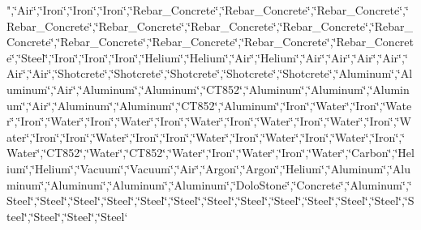 \begin{DoxyCompactItemize}
"{},\char`\"{}Air\char`\"{},\char`\"{}Iron\char`\"{},\char`\"{}Iron\char`\"{},\char`\"{}Iron\char`\"{},\char`\"{}Rebar\-\_\-\-Concrete\char`\"{},\char`\"{}Rebar\-\_\-\-Concrete\char`\"{},\char`\"{}Rebar\-\_\-\-Concrete\char`\"{},\char`\"{}Rebar\-\_\-\-Concrete\char`\"{},\char`\"{}Rebar\-\_\-\-Concrete\char`\"{},\char`\"{}Rebar\-\_\-\-Concrete\char`\"{},\char`\"{}Rebar\-\_\-\-Concrete\char`\"{},\char`\"{}Rebar\-\_\-\-Concrete\char`\"{},\char`\"{}Rebar\-\_\-\-Concrete\char`\"{},\char`\"{}Rebar\-\_\-\-Concrete\char`\"{},\char`\"{}Rebar\-\_\-\-Concrete\char`\"{},\char`\"{}Rebar\-\_\-\-Concrete\char`\"{},\char`\"{}Steel\char`\"{},\char`\"{}Iron\char`\"{},\char`\"{}Iron\char`\"{},\char`\"{}Iron\char`\"{},\char`\"{}Helium\char`\"{},\char`\"{}Helium\char`\"{},\char`\"{}Air\char`\"{},\char`\"{}Helium\char`\"{},\char`\"{}Air\char`\"{},\char`\"{}Air\char`\"{},\char`\"{}Air\char`\"{},\char`\"{}Air\char`\"{},\char`\"{}Air\char`\"{},\char`\"{}Air\char`\"{},\char`\"{}Shotcrete\char`\"{},\char`\"{}Shotcrete\char`\"{},\char`\"{}Shotcrete\char`\"{},\char`\"{}Shotcrete\char`\"{},\char`\"{}Shotcrete\char`\"{},\char`\"{}Aluminum\char`\"{},\char`\"{}Aluminum\char`\"{},\char`\"{}Air\char`\"{},\char`\"{}Aluminum\char`\"{},\char`\"{}Aluminum\char`\"{},\char`\"{}C\-T852\char`\"{},\char`\"{}Aluminum\char`\"{},\char`\"{}Aluminum\char`\"{},\char`\"{}Aluminum\char`\"{},\char`\"{}Air\char`\"{},\char`\"{}Aluminum\char`\"{},\char`\"{}Aluminum\char`\"{},\char`\"{}C\-T852\char`\"{},\char`\"{}Aluminum\char`\"{},\char`\"{}Iron\char`\"{},\char`\"{}Water\char`\"{},\char`\"{}Iron\char`\"{},\char`\"{}Water\char`\"{},\char`\"{}Iron\char`\"{},\char`\"{}Water\char`\"{},\char`\"{}Iron\char`\"{},\char`\"{}Water\char`\"{},\char`\"{}Iron\char`\"{},\char`\"{}Water\char`\"{},\char`\"{}Iron\char`\"{},\char`\"{}Water\char`\"{},\char`\"{}Iron\char`\"{},\char`\"{}Water\char`\"{},\char`\"{}Iron\char`\"{},\char`\"{}Water\char`\"{},\char`\"{}Iron\char`\"{},\char`\"{}Iron\char`\"{},\char`\"{}Water\char`\"{},\char`\"{}Iron\char`\"{},\char`\"{}Iron\char`\"{},\char`\"{}Water\char`\"{},\char`\"{}Iron\char`\"{},\char`\"{}Water\char`\"{},\char`\"{}Iron\char`\"{},\char`\"{}Water\char`\"{},\char`\"{}Iron\char`\"{},\char`\"{}Water\char`\"{},\char`\"{}C\-T852\char`\"{},\char`\"{}Water\char`\"{},\char`\"{}C\-T852\char`\"{},\char`\"{}Water\char`\"{},\char`\"{}Iron\char`\"{},\char`\"{}Water\char`\"{},\char`\"{}Iron\char`\"{},\char`\"{}Water\char`\"{},\char`\"{}Carbon\char`\"{},\char`\"{}Helium\char`\"{},\char`\"{}Helium\char`\"{},\char`\"{}Vacuum\char`\"{},\char`\"{}Vacuum\char`\"{},\char`\"{}Air\char`\"{},\char`\"{}Argon\char`\"{},\char`\"{}Argon\char`\"{},\char`\"{}Helium\char`\"{},\char`\"{}Aluminum\char`\"{},\char`\"{}Aluminum\char`\"{},\char`\"{}Aluminum\char`\"{},\char`\"{}Aluminum\char`\"{},\char`\"{}Aluminum\char`\"{},\char`\"{}Dolo\-Stone\char`\"{},\char`\"{}Concrete\char`\"{},\char`\"{}Aluminum\char`\"{},\char`\"{}Steel\char`\"{},\char`\"{}Steel\char`\"{},\char`\"{}Steel\char`\"{},\char`\"{}Steel\char`\"{},\char`\"{}Steel\char`\"{},\char`\"{}Steel\char`\"{},\char`\"{}Steel\char`\"{},\char`\"{}Steel\char`\"{},\char`\"{}Steel\char`\"{},\char`\"{}Steel\char`\"{},\char`\"{}Steel\char`\"{},\char`\"{}Steel\char`\"{},\char`\"{}Steel\char`\"{},\char`\"{}Steel\char`\"{},\char`\"{}Steel\char`\"{},\char`\"{}Steel\char`\
\end{DoxyCompactItemize}

